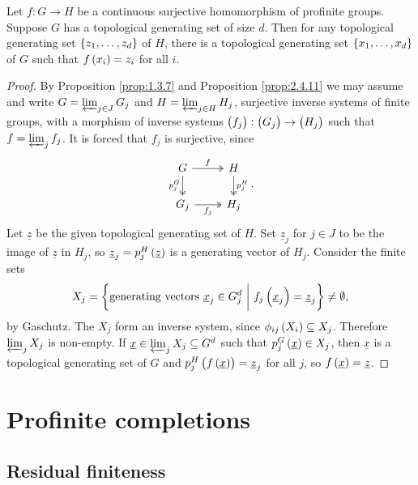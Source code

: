 \begin{theorem}
Let $ f : G \to H $ be a continuous surjective homomorphism of profinite groups. Suppose $ G $ has a topological generating set of size $ d $. Then for any topological generating set $ \cbr{z_1, \dots, z_d} $ of $ H $, there is a topological generating set $ \cbr{x_1, \dots, x_d} $ of $ G $ such that $ f\br{x_i} = z_i $ for all $ i $.
\end{theorem}

\begin{proof}
By Proposition \ref{prop:1.3.7} and Proposition \ref{prop:2.4.11} we may assume and write $ G = \varprojlim_{j \in J} G_j $ and $ H = \varprojlim_{j \in H} H_j $, surjective inverse systems of finite groups, with a morphism of inverse systems $ \br{f_j} : \br{G_j} \to \br{H_j} $ such that $ f = \varprojlim_j f_j $. It is forced that $ f_j $ is surjective, since
$$
\begin{tikzcd}
G \arrow[twoheadrightarrow]{r}{f} \arrow[twoheadrightarrow]{d}[swap]{p_j^G} & H \arrow[twoheadrightarrow]{d}{p_j^H} \\
G_j \arrow[twoheadrightarrow]{r}[swap]{f_j} & H_j
\end{tikzcd}.
$$
Let $ \underline{z} $ be the given topological generating set of $ H $. Set $ \underline{z}_j $ for $ j \in J $ to be the image of $ \underline{z} $ in $ H_j $, so $ \underline{z}_j = p_j^H\br{\underline{z}} $ is a generating vector of $ H_j $. Consider the finite sets
$$ X_j = \cbr{\text{generating vectors} \ \underline{x}_j \in G_j^d \st f_j\br{\underline{x}_j} = \underline{z}_j} \ne \emptyset, $$
by Gaschutz. The $ X_j $ form an inverse system, since $ \phi_{ij}\br{X_i} \subseteq X_j $. Therefore $ \varprojlim_j X_j $ is non-empty. If $ \underline{x} \in \varprojlim_j X_j \subseteq G^d $ such that $ p_j^G\br{\underline{x}} \in X_j $, then $ \underline{x} $ is a topological generating set of $ G $ and $ p_j^H\br{f\br{\underline{x}}} = \underline{z}_j $ for all $ j $, so $ f\br{\underline{x}} = \underline{z} $.
\end{proof}

\pagebreak

\section{Profinite completions}

\subsection{Residual finiteness}

